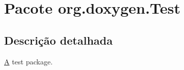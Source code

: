 \hypertarget{namespaceorg_1_1doxygen_1_1_test}{\section{Pacote org.\-doxygen.\-Test}
\label{namespaceorg_1_1doxygen_1_1_test}
}


\subsection{Descrição detalhada}
\hyperlink{class_a}{A} test package. 
